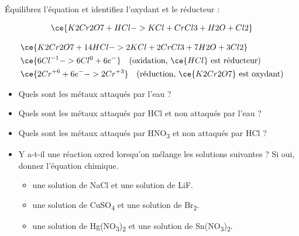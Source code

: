 \documentclass[
  11pt,
  french,
  a4paper,
  openany]{book}
\providecommand{\tightlist}{%
  \setlength{\itemsep}{0pt}\setlength{\parskip}{0pt}}
\begin{document}
\begin{Exercise}
Équilibrez l'équation et identifiez l'oxydant et le réducteur :

\[
\ce{K2Cr2O7 + HCl -> KCl + CrCl3 + H2O + Cl2}
\]

\end{Exercise}

\begin{Answer}
\[
\begin{split}
& \ce{K2Cr2O7 + 14 HCl -> 2 KCl + 2 CrCl3 + 7 H2O + 3 Cl2} \\
& \ce{ 6 Cl^{-1} -> 6 Cl^{0} + 6 e^-} \quad \text{(oxidation, $\ce{HCl}$ est réducteur)} \\
& \ce{ 2 Cr^{+6} + 6 e^- -> 2 Cr^{+3}} \quad \text{(réduction, $\ce{K2Cr2O7}$ est oxydant)}
\end{split}
\]

\end{Answer}

\begin{Exercise}

\begin{itemize}
\tightlist
\item
  Quels sont les métaux attaqués par l'eau ?
\item
  Quels sont les métaux attaqués par HCl et non attaqués par l'eau ?
\item
  Quels sont les métaux attaqués par HNO\textsubscript{3} et non attaqués par HCl ?
\item
  Y a-t-il une réaction oxred lorsqu'on mélange les solutions suivantes ? Si oui, donnez l'équation chimique.

  \begin{itemize}
  \tightlist
  \item
    une solution de NaCl et une solution de LiF.
  \item
    une solution de CuSO\textsubscript{4} et une solution de Br\textsubscript{2}.
  \item
    une solution de Hg(NO\textsubscript{3})\textsubscript{2} et une solution de Sn(NO\textsubscript{3})\textsubscript{2}.
  \end{itemize}
\end{itemize}


\end{Exercise}
\end{document}
